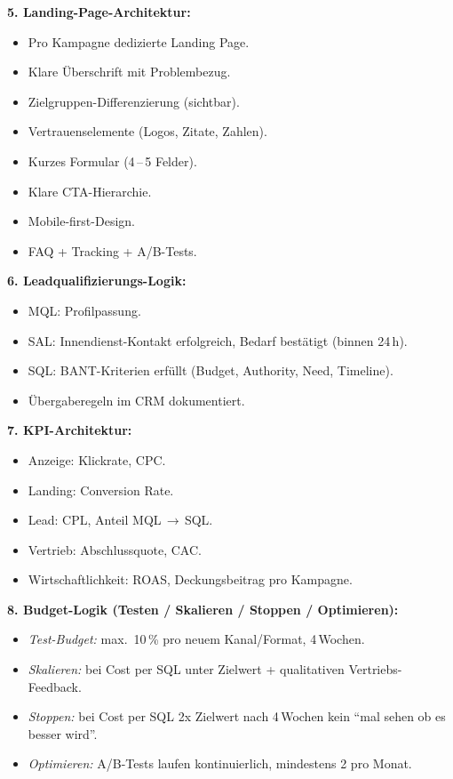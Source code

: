\documentclass[11pt,a4paper,oneside]{article}
\begin{document}
\begin{loesungbox}
\textbf{5. Landing-Page-Architektur:}
\begin{itemize}
  \item Pro Kampagne dedizierte Landing Page.
  \item Klare Überschrift mit Problembezug.
  \item Zielgruppen-Differenzierung (sichtbar).
  \item Vertrauenselemente (Logos, Zitate, Zahlen).
  \item Kurzes Formular (4\,--\,5 Felder).
  \item Klare CTA-Hierarchie.
  \item Mobile-first-Design.
  \item FAQ + Tracking + A/B-Tests.
\end{itemize}

\textbf{6. Leadqualifizierungs-Logik:}
\begin{itemize}
  \item MQL: Profilpassung.
  \item SAL: Innendienst-Kontakt erfolgreich, Bedarf bestätigt (binnen 24\,h).
  \item SQL: BANT-Kriterien erfüllt (Budget, Authority, Need, Timeline).
  \item Übergaberegeln im CRM dokumentiert.
\end{itemize}

\textbf{7. KPI-Architektur:}
\begin{itemize}
  \item Anzeige: Klickrate, CPC.
  \item Landing: Conversion Rate.
  \item Lead: CPL, Anteil MQL\,$\rightarrow$\,SQL.
  \item Vertrieb: Abschlussquote, CAC.
  \item Wirtschaftlichkeit: ROAS, Deckungsbeitrag pro Kampagne.
\end{itemize}

\textbf{8. Budget-Logik (Testen / Skalieren / Stoppen / Optimieren):}
\begin{itemize}
  \item \emph{Test-Budget:} max.\ 10\,\% pro neuem Kanal/Format, 4\,Wochen.
  \item \emph{Skalieren:} bei Cost per SQL unter Zielwert + qualitativen Vertriebs-Feedback.
  \item \emph{Stoppen:} bei Cost per SQL 2x Zielwert nach 4\,Wochen \textendash{} kein ``mal sehen ob es besser wird''.
  \item \emph{Optimieren:} A/B-Tests laufen kontinuierlich, mindestens 2 pro Monat.
\end{itemize}


\end{loesungbox}
\end{document}
